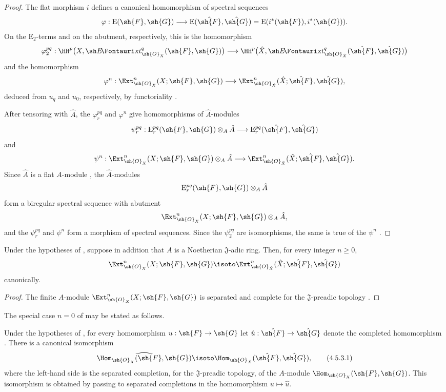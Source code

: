 \begin{proof}
The flat morphism $i$ defines a canonical homomorphism of spectral
sequences
\[
  \varphi:\mathrm{E}(\sh{F},\sh{G})
  \longrightarrow
  \mathrm{E}(\hat{\sh{F}},\hat{\sh{G}})
  =
  \mathrm{E}(i^*(\sh{F}),i^*(\sh{G})).
\]
On the $\mathrm{E}_2$-terms and on the abutment, respectively, this
is the homomorphism
\[
  \varphi_2^{pq}:
  \HH^p\bigl(X,\shExt^q_{\sh{O}_X}(\sh{F},\sh{G})\bigr)
  \longrightarrow
  \HH^p\bigl(\hat{X},
    \shExt^q_{\sh{O}_{\hat{X}}}
      (\hat{\sh{F}},\hat{\sh{G}})\bigr)
\]
and the homomorphism
\[
  \varphi^n:
  \Ext^n_{\sh{O}_X}(X;\sh{F},\sh{G})
  \longrightarrow
  \Ext^n_{\sh{O}_{\hat{X}}}
    (\hat{X};\hat{\sh{F}},\hat{\sh{G}}),
\]
deduced from $u_q$ and $u_0$, respectively, by functoriality
.

After tensoring with $\hat{A}$, the $\varphi_r^{pq}$ and
$\varphi^n$ give homomorphisms of $\hat{A}$-modules
\[
  \psi_r^{pq}:
  \mathrm{E}_r^{pq}(\sh{F},\sh{G})\otimes_A\hat{A}
  \longrightarrow
  \mathrm{E}_r^{pq}(\hat{\sh{F}},\hat{\sh{G}})
\]
and
\[
  \psi^n:
  \Ext^n_{\sh{O}_X}(X;\sh{F},\sh{G})\otimes_A\hat{A}
  \longrightarrow
  \Ext^n_{\sh{O}_{\hat{X}}}
    (\hat{X};\hat{\sh{F}},\hat{\sh{G}}).
\]
Since $\hat{A}$ is a flat $A$-module , the
$\hat{A}$-modules
\[
  \mathrm{E}_r^{pq}(\sh{F},\sh{G})\otimes_A\hat{A}
\]
form a biregular spectral sequence with abutment
\[
  \Ext^n_{\sh{O}_X}(X;\sh{F},\sh{G})\otimes_A\hat{A},
\]
and the $\psi_r^{pq}$ and $\psi^n$ form a morphism of spectral
sequences.  Since the $\psi_2^{pq}$ are isomorphisms, the same is true
of the $\psi^n$ .
\end{proof}

\begin{corollary}[4.5.2]
\label{III.4.5.2}
Under the hypotheses of , suppose in addition that
$A$ is a Noetherian $\mathfrak J$-adic ring.  Then, for every integer
$n\geq0$,
\[
  \Ext^n_{\sh{O}_X}(X;\sh{F},\sh{G})
  \isoto
  \Ext^n_{\sh{O}_{\hat{X}}}
    (\hat{X};\hat{\sh{F}},\hat{\sh{G}})
\]
canonically.
\end{corollary}

\begin{proof}
The finite $A$-module
$\Ext^n_{\sh{O}_X}(X;\sh{F},\sh{G})$ is separated and complete for
the $\mathfrak J$-preadic topology .
\end{proof}

The special case $n=0$ of  may be stated as follows.

\begin{corollary}[4.5.3]
\label{III.4.5.3}
Under the hypotheses of , for every homomorphism
$u:\sh{F}\to\sh{G}$ let $\hat{u}:\hat{\sh{F}}\to\hat{\sh{G}}$
denote the completed homomorphism .  There is a
canonical isomorphism
\[
\label{III.4.5.3.1}
  \widehat{\Hom_{\sh{O}_X}(\sh{F},\sh{G})}
  \isoto
  \Hom_{\sh{O}_{\hat{X}}}(\hat{\sh{F}},\hat{\sh{G}}),
  \tag{4.5.3.1}
\]
where the left-hand side is the separated completion, for the
$\mathfrak J$-preadic topology, of the $A$-module
$\Hom_{\sh{O}_X}(\sh{F},\sh{G})$.  This isomorphism is obtained by
passing to separated completions in the homomorphism
$u\mapsto\hat{u}$.
\end{corollary}


